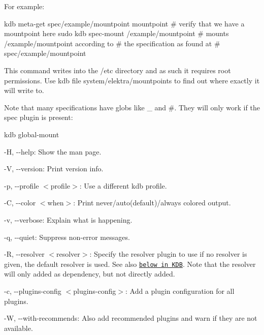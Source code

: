 For example\+:


\begin{DoxyCode}
kdb meta-get spec/example/mountpoint mountpoint  # verify that we have a mountpoint here
sudo kdb spec-mount /example/mountpoint  # mounts /example/mountpoint according to
                                         # the specification as found at
                                         # spec/example/mountpoint
\end{DoxyCode}


This command writes into the {\ttfamily /etc} directory and as such it requires root permissions. Use {\ttfamily kdb file system/elektra/mountpoints} to find out where exactly it will write to.

Note that many specifications have globs like {\ttfamily \+\_\+} and {\ttfamily \#}. They will only work if the {\ttfamily spec} plugin is present\+:


\begin{DoxyCode}
kdb global-mount
\end{DoxyCode}



\begin{DoxyItemize}
\item {\ttfamily -\/H}, {\ttfamily -\/-\/help}\+: Show the man page.
\item {\ttfamily -\/V}, {\ttfamily -\/-\/version}\+: Print version info.
\item {\ttfamily -\/p}, {\ttfamily -\/-\/profile $<$profile$>$}\+: Use a different kdb profile.
\item {\ttfamily -\/C}, {\ttfamily -\/-\/color $<$when$>$}\+: Print never/auto(default)/always colored output.
\item {\ttfamily -\/v}, {\ttfamily -\/-\/verbose}\+: Explain what is happening.
\item {\ttfamily -\/q}, {\ttfamily -\/-\/quiet}\+: Suppress non-\/error messages.
\item {\ttfamily -\/R}, {\ttfamily -\/-\/resolver $<$resolver$>$}\+: Specify the resolver plugin to use if no resolver is given, the default resolver is used. See also \href{#KDB}{\tt below in K\+DB}. Note that the resolver will only added as dependency, but not directly added.
\item {\ttfamily -\/c}, {\ttfamily -\/-\/plugins-\/config $<$plugins-\/config$>$}\+: Add a plugin configuration for all plugins.
\item {\ttfamily -\/W}, {\ttfamily -\/-\/with-\/recommends}\+: Also add recommended plugins and warn if they are not available.
\end{DoxyItemize}



